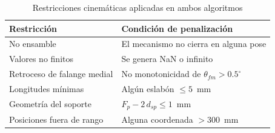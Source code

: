 \documentclass[conference]{IEEEtran}
\begin{document}
\begin{table}[htbp]
\caption{Restricciones cinemáticas aplicadas en ambos algoritmos}
\begin{center}
\begin{tabular}{|l|l|}
\hline
\textbf{Restricción} & \textbf{Condición de penalización} \\
\hline
No ensamble & El mecanismo no cierra en alguna pose \\
\hline
Valores no finitos & Se genera NaN o infinito \\
\hline
Retroceso de falange medial & No monotonicidad de $\theta_{fm} > 0.5^{\circ}$ \\
\hline
Longitudes mínimas & Algún eslabón $\leq 5$~mm \\
\hline
Geometría del soporte & $F_p - 2\,d_{sp} \leq 1$~mm \\
\hline
Posiciones fuera de rango & Alguna coordenada $> 300$~mm \\
\hline
\end{tabular}
\label{tab:restricciones}
\end{center}
\end{table}
\end{document}
